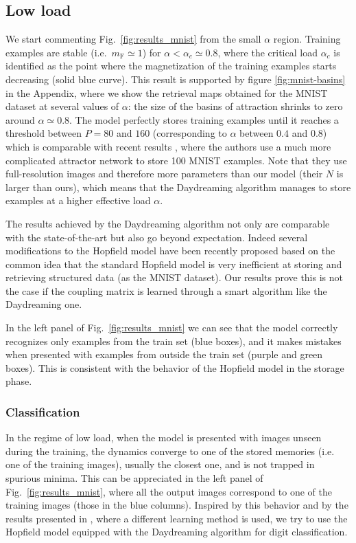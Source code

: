 \documentclass[a4paper]{cas-sc}
\newcommand{\mF}{m_\text{F}}
\begin{document}
\subsection{Low load}
We start commenting Fig.~\ref{fig:results_mnist} from the small $\alpha$ region.
Training examples are stable (i.e.\ $\mF\simeq1$) for $\alpha<\alpha_c\simeq 0.8$, where the critical load $\alpha_c$ is identified as the point where the magnetization of the training examples starts decreasing (solid blue curve). This result is supported by figure \ref{fig:mnist-basins} in the Appendix, where we show the retrieval maps obtained for the MNIST dataset at several values of $\alpha$: the size of the basins of attraction shrinks to zero around $\alpha\simeq 0.8$.
The model perfectly stores training examples until it reaches a threshold between $P=80$ and $160$ (corresponding to $\alpha$ between $0.4$ and $0.8$) which is comparable with recent results \cite{nouri2023eigen}, where the authors use a much more complicated attractor network to store 100 MNIST examples. Note that they use full-resolution images and therefore more parameters than our model (their $N$ is larger than ours), which means that the Daydreaming algorithm manages to store examples at a higher effective load $\alpha$.

The results achieved by the Daydreaming algorithm not only are comparable with the state-of-the-art \cite{nouri2023eigen} but also go beyond expectation. Indeed several modifications to the Hopfield model have been recently proposed based on the common idea that the standard Hopfield model is very inefficient at storing and retrieving structured data (as the MNIST dataset). Our results prove this is not the case if the coupling matrix is learned through a smart algorithm like the Daydreaming one.

In the left panel of Fig.~\ref{fig:results_mnist} we can see that the model correctly recognizes only examples from the train set (blue boxes), and it makes mistakes when presented with examples from outside the train set (purple and green boxes). This is consistent with the behavior of the Hopfield model in the storage phase.

\subsubsection{Classification}
In the regime of low load, when the model is presented with images unseen during the training, the dynamics converge to one of the stored memories (i.e. one of the training images), usually the closest one, and is not trapped in spurious minima. This can be appreciated in the left panel of Fig.~\ref{fig:results_mnist}, where all the output images correspond to one of the training images (those in the blue columns). Inspired by this behavior and by the results presented in \cite{belyaev2020classification}, where a different learning method is used, we try to use the Hopfield model equipped with the Daydreaming algorithm for digit classification. 
\end{document}
